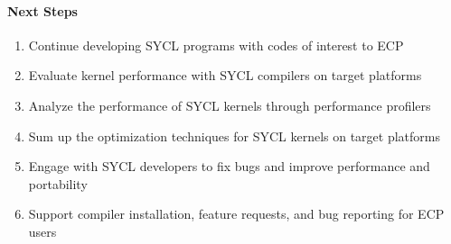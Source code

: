 \paragraph{Next Steps}

\begin{enumerate}
\item Continue developing SYCL programs with codes of interest to ECP
\item Evaluate kernel performance with SYCL compilers on target platforms
\item Analyze the performance of SYCL kernels through performance profilers
\item Sum up the optimization techniques for SYCL kernels on target platforms
\item Engage with SYCL developers to fix bugs and improve performance and portability 
\item Support compiler installation, feature requests, and bug reporting for ECP users
\end{enumerate}
